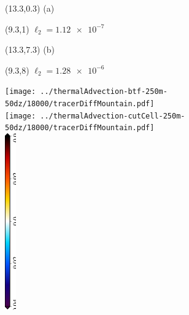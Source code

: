\documentclass{article}
\begin{document}
\TPMargin{3pt}
\begin{textblock}{1.5}(13.3,0.3)
\normalsize
\centering
(a)
\end{textblock}
\begin{textblock}{5.5}(9.3,1)
\normalsize
$\ell_2 = \num{1.12e-7}$
\end{textblock}
\begin{textblock}{1.5}(13.3,7.3)
\normalsize
\centering
(b)
\end{textblock}
\begin{textblock}{5.5}(9.3,8)
\normalsize
$\ell_2 = \num{1.28e-6}$
\end{textblock}
\centering
\texttt{[image: ../thermalAdvection-btf-250m-50dz/18000/tracerDiffMountain.pdf]} \\
\vspace*{0.1in}
\texttt{[image: ../thermalAdvection-cutCell-250m-50dz/18000/tracerDiffMountain.pdf]} \\
\includegraphics[height=3in,angle=270]{tracerDiffMountain_T_diff.eps}
\end{document}
